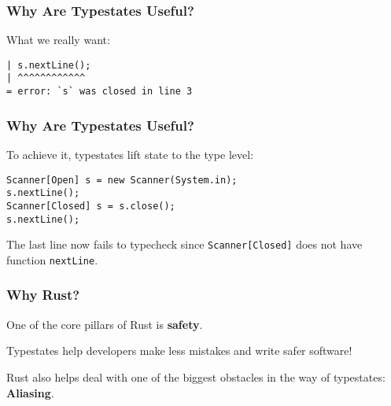 \documentclass[notes]{beamer}
\begin{document}
\begin{frame}[fragile]
    \frametitle{Why Are Typestates Useful?}
    What we really want:
    \begin{lstlisting}
| s.nextLine();
| ^^^^^^^^^^^^
= error: `s` was closed in line 3
    \end{lstlisting}

\end{frame}

\begin{frame}[fragile]
    \frametitle{Why Are Typestates Useful?}
    To achieve it, typestates lift state to the type level:
    \begin{lstlisting}
Scanner[Open] s = new Scanner(System.in);
s.nextLine();
Scanner[Closed] s = s.close();
s.nextLine();
    \end{lstlisting}
    The last line now fails to typecheck since \texttt{Scanner[Closed]}
    does not have function \texttt{nextLine}.

\end{frame}

\begin{frame}
    \frametitle{Why Rust?}

    One of the core pillars of Rust is \textbf{safety}.

    Typestates help developers make less mistakes and write safer software!

    Rust also helps deal with one of the biggest obstacles in the way of typestates: \textbf{Aliasing}.

\end{frame}
\end{document}
